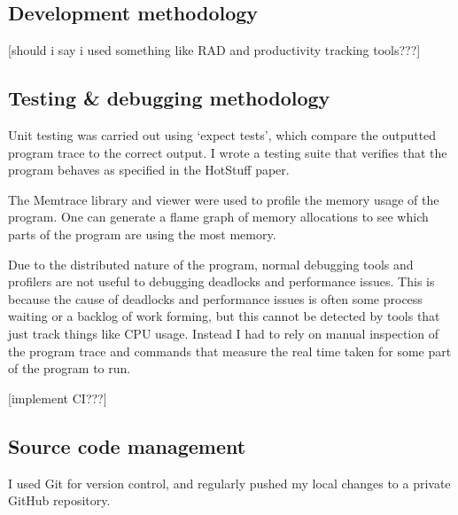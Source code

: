 \subsection{Development methodology}
[should i say i used something like RAD and productivity tracking tools???]
\subsection{Testing \& debugging methodology}
Unit testing was carried out using `expect tests', which compare the outputted program trace to the correct output. I wrote a testing suite that verifies that the program behaves as specified in the HotStuff paper.

The Memtrace library and viewer were used to profile the memory usage of the program. One can generate a flame graph of memory allocations to see which parts of the program are using the most memory.

Due to the distributed nature of the program, normal debugging tools and profilers are not useful to debugging deadlocks and performance issues. This is because the cause of deadlocks and performance issues is often some process waiting or a backlog of work forming, but this cannot be detected by tools that just track things like CPU usage. Instead I had to rely on manual inspection of the program trace and commands that measure the real time taken for some part of the program to run.

[implement CI???]
\subsection{Source code management}
I used Git for version control, and regularly pushed my local changes to a private GitHub repository.
